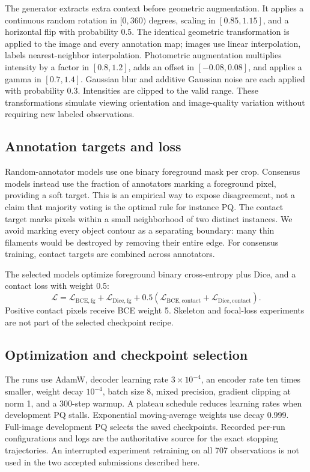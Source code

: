 \documentclass[sigconf,nonacm]{acmart}
\begin{document}
The generator extracts extra context before geometric augmentation.
It applies a continuous random rotation in $[0,360)$ degrees, scaling in
$[0.85,1.15]$, and a horizontal flip with probability 0.5. The identical
geometric transformation is applied to the image and every annotation map;
images use linear interpolation, labels nearest-neighbor interpolation.
Photometric augmentation multiplies intensity by a factor in $[0.8,1.2]$,
adds an offset in $[-0.08,0.08]$, and applies a gamma in $[0.7,1.4]$.
Gaussian blur and additive Gaussian noise are each applied with probability
0.3. Intensities are clipped to the valid range. These transformations
simulate viewing orientation and image-quality variation without requiring
new labeled observations.

\subsection{Annotation targets and loss}
Random-annotator models use one binary foreground mask per crop. Consensus
models instead use the fraction of annotators marking a foreground pixel,
providing a soft target. This is an empirical way to expose disagreement,
not a claim that majority voting is the optimal rule for instance PQ.
The contact target marks pixels within a small neighborhood of two distinct
instances. We avoid marking every object contour as a separating boundary:
many thin filaments would be destroyed by removing their entire edge.
For consensus training, contact targets are combined across annotators.

The selected models optimize foreground binary cross-entropy plus Dice,
and a contact loss with weight 0.5:
\begin{equation}
\mathcal{L}=\mathcal{L}_{\mathrm{BCE,fg}}+\mathcal{L}_{\mathrm{Dice,fg}}
+0.5(\mathcal{L}_{\mathrm{BCE,contact}}+\mathcal{L}_{\mathrm{Dice,contact}}).
\end{equation}
Positive contact pixels receive BCE weight 5. Skeleton and focal-loss
experiments are not part of the selected checkpoint recipe.

\subsection{Optimization and checkpoint selection}
The runs use AdamW, decoder learning rate $3\times10^{-4}$, an encoder
rate ten times smaller, weight decay $10^{-4}$, batch size 8, mixed
precision, gradient clipping at norm 1, and a 300-step warmup. A plateau
schedule reduces learning rates when development PQ stalls. Exponential
moving-average weights use decay 0.999. Full-image development PQ selects
the saved checkpoints. Recorded per-run configurations and logs are the
authoritative source for the exact stopping trajectories. An interrupted
experiment retraining on all 707 observations is not used in the two
accepted submissions described here.
\end{document}
